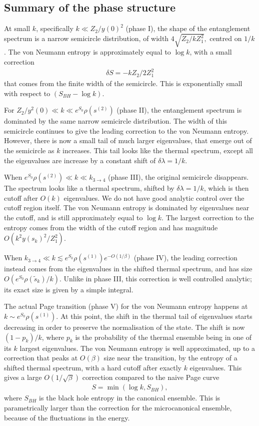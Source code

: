 \documentclass[11pt]{article}
\renewcommand{\tilde}{\widetilde}
\newcommand{\smax}{s_k}
\newcommand{\stilde}{\tilde{s}_k}
\numberwithin{equation}{section}
\begin{document}
\subsection*{Summary of the phase structure}

At small $k$, specifically $k \ll Z_2/y(0)^2$ (phase I), the shape of the entanglement spectrum is a narrow semicircle distribution, of width $4 \sqrt{ Z_2 / k Z_1^2},$ 
centred on $1/k$. The von Neumann entropy is approximately equal to $\log k$, with a small correction 
\begin{align}
\delta S = - k Z_2 /2 Z_1^2
\end{align}
 that comes from the finite width of the semicircle. This is exponentially small with respect to $(S_{BH} - \log k)$.

For $Z_2/y^2(0) \ll k \ll e^{S_0} \rho( s^{(2)})$ (phase II), the entanglement spectrum is dominated by the same narrow semicircle distribution. The width of this semicircle continues to give the leading correction to the von Neumann entropy. However, there is now a small tail of much larger eigenvalues, that emerge out of the semicircle as $k$ increases. This tail looks like the thermal spectrum, except all the eigenvalues are increase by a constant shift of $\delta \lambda = 1/k$.

When $e^{S_0} \rho( s^{(2)}) \ll k \ll k_{3 \to 4}$ (phase III), the original semicircle disappears. The spectrum looks like a thermal spectrum, shifted by $\delta \lambda = 1/k$, which is then cutoff after $O(k)$ eigenvalues. We do not have good analytic control over the cutoff region itself. The von Neumann entropy is dominated by eigenvalues near the cutoff, and is still approximately equal to $\log k$. The largest correction to the entropy comes from the width of the cutoff region and has magnitude $O(k^2 y(\smax)^2/Z_1^2)$.

When $k_{3 \to 4} \ll k \lesssim e^{S_0} \rho( s^{(1)})e^{-O(1/\beta)}$ (phase IV), the leading correction instead comes from the eigenvalues in the shifted thermal spectrum, and has size $O(e^{S_0} \rho(\stilde)/k)$. Unlike in phase III, this correction is well controlled analytic; its exact size is given by a simple integral.

The actual Page transition (phase V) for the von Neumann entropy happens at $k \sim e^{S_0} \rho(s^{(1)})$. At this point, the shift in the thermal tail of eigenvalues starts decreasing in order to preserve the normalisation of the state. The shift is now $(1- p_k)/k$, where $p_k$ is the probability of the thermal ensemble being in one of its $k$ largest eigenvalues. The von Neumann entropy is well approximated, up to a correction that peaks at $O(\beta)$ size near the transition, by the entropy of a shifted thermal spectrum, with a hard cutoff after exactly $k$ eigenvalues. This gives a large $O(1/\sqrt{\beta})$ correction compared to the naive Page curve
\begin{align} \label{eq:naivepagesummary}
S = \min\left( \log k, S_{BH}\right),
\end{align}
where $S_{BH}$ is the black hole entropy in the canonical ensemble. This is parametrically larger than the correction for the microcanonical ensemble, because of the fluctuations in the energy.
\end{document}
